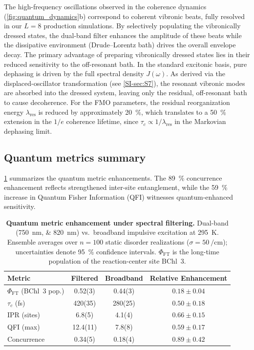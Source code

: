 \documentclass[journal=jpcl,manuscript=letter]{achemso}
\begin{document}
The high-frequency oscillations observed in the coherence dynamics (\cref{fig:quantum_dynamics}b) correspond to coherent vibronic beats, fully resolved in our $L=8$ production simulations. By selectively populating the vibronically dressed states, the dual-band filter enhances the amplitude of these beats while the dissipative environment (Drude--Lorentz bath) drives the overall envelope decay. The primary advantage of preparing vibronically dressed states lies in their reduced sensitivity to the off-resonant bath. In the standard excitonic basis, pure dephasing is driven by the full spectral density $J(\omega)$. As derived via the displaced-oscillator transformation (see \cref{SI-sec:S7}), the resonant vibronic modes are absorbed into the dressed system, leaving only the residual, off-resonant bath to cause decoherence. For the FMO parameters, the residual reorganization energy $\lambda_{\mathrm{res}}$ is reduced by approximately \SI{20}{\percent}, which translates to a \SI{50}{\percent} extension in the $1/e$ coherence lifetime, since $\tau_c \propto 1/\lambda_{\mathrm{res}}$ in the Markovian dephasing limit.

\subsection*{Quantum metrics summary}

\cref{tab:quantum_metrics} summarizes the quantum metric enhancements. The \SI{89}{\percent} concurrence enhancement reflects strengthened inter-site entanglement, while the \SI{59}{\percent} increase in Quantum Fisher Information (QFI) witnesses quantum-enhanced sensitivity.

\begin{table}[htpb]
\centering
\caption{\textbf{Quantum metric enhancement under spectral filtering.} Dual-band (\SIlist{750;820}{\nano\meter}) vs.\ broadband impulsive excitation at \SI{295}{\kelvin}. Ensemble averages over $n=100$ static disorder realizations ($\sigma = \SI{50}{\per\centi\meter}$); uncertainties denote \SI{95}{\percent} confidence intervals. $\Phi_{\mathrm{FT}}$ is the long-time population of the reaction-center site BChl~3.}
\label{tab:quantum_metrics}
\begin{tabular}{lccc}
\toprule
\textbf{Metric} & \textbf{Filtered} & \textbf{Broadband} & \textbf{Relative Enhancement} \\
\midrule
$\Phi_{\mathrm{FT}}$ (BChl~3 pop.) & 0.52(3) & 0.44(3) & $0.18 \pm 0.04$ \\
$\tau_c$ (\si{\femto\second}) & 420(35) & 280(25) & $0.50 \pm 0.18$ \\
IPR (sites) & 6.8(5) & 4.1(4) & $0.66 \pm 0.15$ \\
QFI (max) & 12.4(11) & 7.8(8) & $0.59 \pm 0.17$ \\
Concurrence & 0.34(5) & 0.18(4) & $0.89 \pm 0.42$ \\
\bottomrule
\end{tabular}
\end{table}
\end{document}
